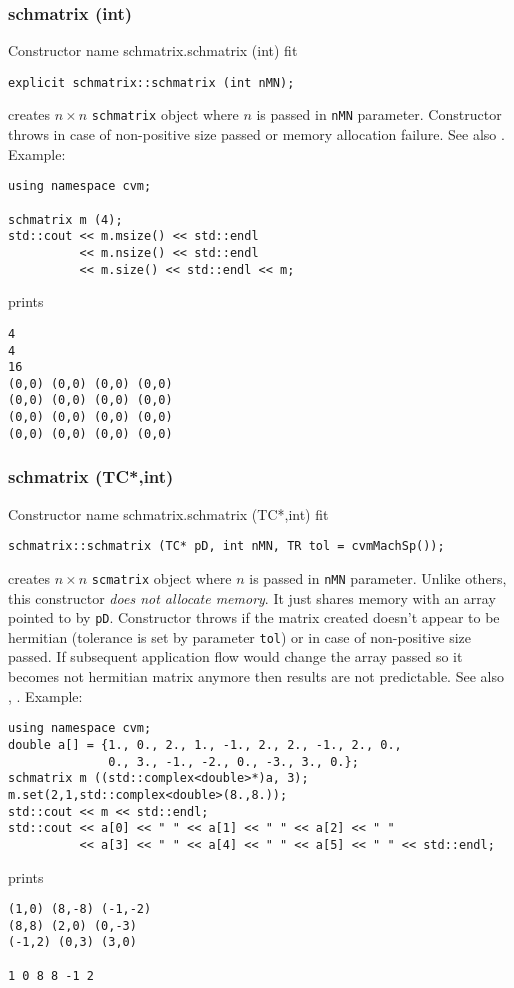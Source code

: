 \subsubsection{schmatrix (int)}
Constructor%
\pdfdest name {schmatrix.schmatrix (int)} fit
\begin{verbatim}
explicit schmatrix::schmatrix (int nMN);
\end{verbatim}
creates  $n\times n$ \verb"schmatrix" object where $n$ is passed in
\verb"nMN" parameter.
Constructor throws  
in case of non-positive size passed or memory allocation failure.
See also .
Example:
\begin{Verbatim}
using namespace cvm;

schmatrix m (4);
std::cout << m.msize() << std::endl 
          << m.nsize() << std::endl
          << m.size() << std::endl << m;
\end{Verbatim}
prints
\begin{Verbatim}
4
4
16
(0,0) (0,0) (0,0) (0,0)
(0,0) (0,0) (0,0) (0,0)
(0,0) (0,0) (0,0) (0,0)
(0,0) (0,0) (0,0) (0,0)
\end{Verbatim}
\newpage




\subsubsection{schmatrix (TC*,int)}
Constructor%
\pdfdest name {schmatrix.schmatrix (TC*,int)} fit
\begin{verbatim}
schmatrix::schmatrix (TC* pD, int nMN, TR tol = cvmMachSp());
\end{verbatim}
creates  $n\times n$ \verb"scmatrix" object where $n$ is passed in
\verb"nMN" parameter.
Unlike others, this constructor \textit{does not allocate  memory}.
It just shares  memory with an array pointed to by \verb"pD".
Constructor throws  
if the matrix created doesn't appear to be hermitian (tolerance is set by
parameter \verb'tol') or in case of non-positive size passed. 
If subsequent application flow would change the array passed so
it becomes not  hermitian matrix anymore then results are not predictable.
See also ,
.
Example:
\begin{Verbatim}
using namespace cvm;
double a[] = {1., 0., 2., 1., -1., 2., 2., -1., 2., 0.,
              0., 3., -1., -2., 0., -3., 3., 0.};
schmatrix m ((std::complex<double>*)a, 3);
m.set(2,1,std::complex<double>(8.,8.));
std::cout << m << std::endl;
std::cout << a[0] << " " << a[1] << " " << a[2] << " "
          << a[3] << " " << a[4] << " " << a[5] << " " << std::endl;
\end{Verbatim}
prints
\begin{Verbatim}
(1,0) (8,-8) (-1,-2)
(8,8) (2,0) (0,-3)
(-1,2) (0,3) (3,0)

1 0 8 8 -1 2
\end{Verbatim}
\newpage



